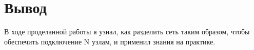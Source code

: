 \chapter{Вывод}
\label{ch:chap3}

В ходе проделанной работы я узнал, как разделить сеть таким образом, чтобы обеспечить подключение N узлам, и применил знания на 
практике.
\endinput